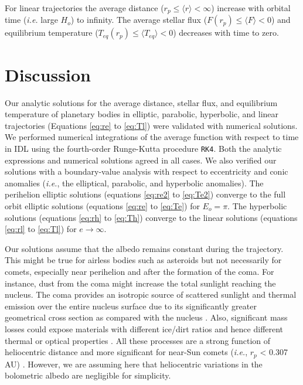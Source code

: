 \documentclass[a4paper,fleqn,usenatbib]{mnras}
\begin{document}

For linear trajectories the average distance ($r_p \leq \langle r \rangle < \infty$) increase with orbital time (\emph{i.e.} large $H_o$) to infinity. The average stellar flux ($F(r_p) \leq \langle F \rangle < 0$) and equilibrium temperature ($T_{eq}(r_p) \leq \langle T_{eq} \rangle < 0$) decreases with time to zero.


\section{Discussion}
\label{sec:discussion}


Our analytic solutions for the average distance, stellar flux, and equilibrium temperature of planetary bodies in elliptic, parabolic, hyperbolic, and linear trajectories (Equations \ref{eq:re} to \ref{eq:Tl}) were validated with numerical solutions. We performed numerical integrations of the average function with respect to time in IDL using the fourth-order Runge-Kutta procedure \texttt{RK4}. Both the analytic expressions and numerical solutions agreed in all cases. We also verified our solutions with a boundary-value analysis with respect to eccentricity and conic anomalies (\emph{i.e.}, the elliptical, parabolic, and hyperbolic anomalies). The perihelion elliptic solutions (equations \ref{eq:re2} to \ref{eq:Te2}) converge to the full orbit elliptic solutions (equations \ref{eq:re} to \ref{eq:Te}) for $E_o = \pi$. The hyperbolic solutions (equations \ref{eq:rh} to \ref{eq:Th}) converge to the linear solutions (equations \ref{eq:rl} to \ref{eq:Tl}) for $e \rightarrow \infty$.


Our solutions assume that the albedo remains constant during the trajectory. This might be true for airless bodies such as asteroids but not necessarily for comets, especially near perihelion and after the formation of the coma. For instance, dust from the coma might increase the total sunlight reaching the nucleus. The coma provides an isotropic source of scattered sunlight and thermal emission over the entire nucleus surface due to its significantly greater geometrical cross section as compared with the nucleus \citep{1981Icar...47..302W}. Also, significant mass losses could expose materials with different ice/dirt ratios and hence different thermal or optical properties \citep{1984Icar...57...55H}. All these processes are a strong function of heliocentric distance and more significant for near-Sun comets (\emph{i.e.}, $r_p$ < 0.307 AU) \citep{2018SSRv..214...20J}. However, we are assuming here that heliocentric variations in the bolometric albedo are negligible for simplicity.
\end{document}
